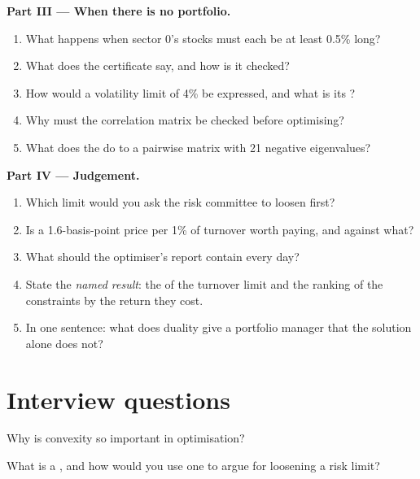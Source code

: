 \begin{problem}
\medskip\noindent\textbf{Part III --- When there is no portfolio.}
\begin{enumerate}[resume]
\item What happens when sector 0's stocks must each be at least 0.5\% long?
\item What does the certificate say, and how is it checked?
\item How would a volatility limit of 4\% be expressed, and what is its ?
\item Why must the correlation matrix be checked before optimising?
\item What does the  do to a pairwise matrix with 21 negative eigenvalues?
\end{enumerate}

\medskip\noindent\textbf{Part IV --- Judgement.}
\begin{enumerate}[resume]
\item Which limit would you ask the risk committee to loosen first?
\item Is a 1.6-basis-point price per 1\% of turnover worth paying, and against what?
\item What should the optimiser's report contain every day?
\item State the \emph{named result}: the  of the turnover limit and the ranking of the constraints by the return they cost.
\item In one sentence: what does duality give a portfolio manager that the solution alone does not?
\end{enumerate}
\end{problem}

\section{Interview questions}

\begin{interviewq}\label{iq:qm:convex-optimisation:1}
Why is convexity so important in optimisation?
\end{interviewq}

\begin{interviewq}\label{iq:qm:convex-optimisation:2}
What is a , and how would you use one to argue for loosening a risk limit?
\end{interviewq}


